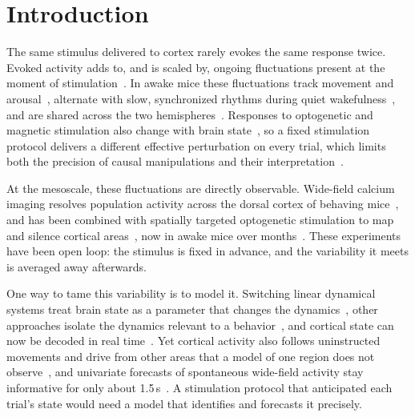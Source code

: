 \section*{Introduction}

The same stimulus delivered to cortex rarely evokes the same response twice. Evoked activity adds to, and is scaled by,
ongoing fluctuations present at the moment of stimulation~\citep{Arieli1996, Petersen2003, Goris2014}. In awake mice
these fluctuations track movement and arousal~\citep{Niell2010, McGinley2015, Vinck2015, musall2019single,
stringer2019spontaneous, Salkoff2020}, alternate with slow, synchronized rhythms during quiet
wakefulness~\citep{Crochet2006, Poulet2008, Reimer2014}, and are shared across the two
hemispheres~\citep{Mohajerani2010, Shimaoka2019, Ye2026}. Responses to optogenetic and magnetic stimulation also change
with brain state~\citep{Mateo2011, Massimini2005, bryan2025temporal}, so a fixed stimulation protocol delivers a
different effective perturbation on every trial, which limits both the precision of causal manipulations and their
interpretation~\citep{Harris2011, Wolff2018}.

At the mesoscale, these fluctuations are directly observable. Wide-field calcium imaging resolves population activity
across the dorsal cortex of behaving mice~\citep{allen2017global, makino2017transformation, musall2019single,
Peters2021}, and has been combined with spatially targeted optogenetic stimulation to map and silence cortical
areas~\citep{Lim2012, ZatkaHaas2021}, now in awake mice over months~\citep{Matveev2024}. These experiments have been
open loop: the stimulus is fixed in advance, and the variability it meets is averaged away afterwards.

One way to tame this variability is to model it. Switching linear dynamical systems treat brain state as a parameter
that changes the dynamics~\citep{linderman2017rslds}, other approaches isolate the dynamics relevant to a
behavior~\citep{sani2021modeling}, and cortical state can now be decoded in real time~\citep{weiss2024realtime}. Yet
cortical activity also follows uninstructed movements and drive from other areas that a model of one region does not
observe~\citep{musall2019single, stringer2019spontaneous, zagha2013motor}, and univariate forecasts of spontaneous
wide-field activity stay informative for only about 1.5\,s~\citep{lu2025benchmarking}. A stimulation protocol that
anticipated each trial's state would need a model that identifies and forecasts it precisely.

